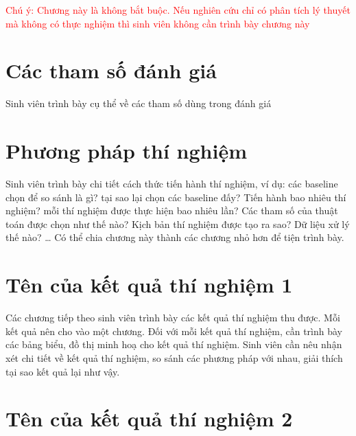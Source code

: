 \documentclass[../DoAn.tex]{subfiles}
\begin{document}
\textcolor{red}{Chú ý: Chương này là không bắt buộc. Nếu nghiên cứu chỉ có phân tích lý thuyết mà không có thực nghiệm thì sinh viên không cần trình bày chương này }

\section{Các tham số đánh giá}

Sinh viên trình bày cụ thể về các tham số dùng trong đánh giá 

\section{Phương pháp thí nghiệm}

Sinh viên trình bày chi tiết cách thức tiến hành thí nghiệm, ví dụ: các baseline chọn để so sánh là gì? tại sao lại chọn các baseline đấy? Tiến hành bao nhiêu thí nghiệm? mỗi thí nghiệm được thực hiện bao nhiêu lần? Các tham số của thuật toán được chọn như thế nào? Kịch bản thí nghiệm được tạo ra sao? Dữ liệu xử lý thế nào? … Có thể chia  chương này thành các chương nhỏ hơn để tiện trình bày. 

\section{Tên của kết quả thí nghiệm 1}

Các chương tiếp theo sinh viên trình bày các kết quả thí nghiệm thu được. Mỗi kết quả nên cho vào một chương. Đối với mỗi kết quả thí nghiệm, cần trình bày các bảng biểu, đồ thị minh hoạ cho kết quả thí nghiệm. Sinh viên cần nêu nhận xét chi tiết về kết quả thí nghiệm, so sánh các phương pháp với nhau, giải thích tại sao kết quả lại như vậy. 

\section{Tên của kết quả thí nghiệm 2}
\end{document}
